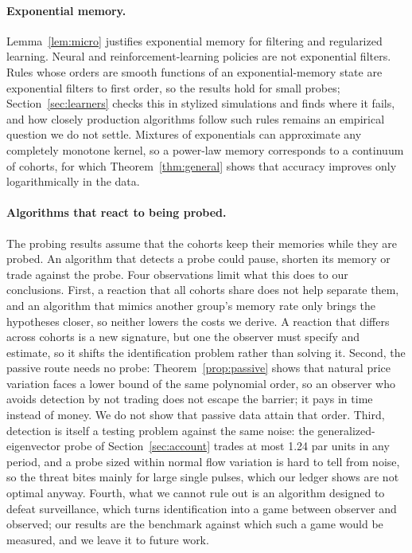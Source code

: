 \documentclass[12pt]{article}
\theoremstyle{definition}
\theoremstyle{remark}
\begin{document}
\paragraph{Exponential memory.} Lemma~\ref{lem:micro} justifies exponential memory for filtering and regularized learning. Neural and reinforcement-learning policies are not exponential filters. Rules whose orders are smooth functions of an exponential-memory state are exponential filters to first order, so the results hold for small probes; Section~\ref{sec:learners} checks this in stylized simulations and finds where it fails, and how closely production algorithms follow such rules remains an empirical question we do not settle. Mixtures of exponentials can approximate any completely monotone kernel, so a power-law memory corresponds to a continuum of cohorts, for which Theorem~\ref{thm:general} shows that accuracy improves only logarithmically in the data.

\paragraph{Algorithms that react to being probed.} The probing results assume that the cohorts keep their memories while they are probed. An algorithm that detects a probe could pause, shorten its memory or trade against the probe. Four observations limit what this does to our conclusions. First, a reaction that all cohorts share does not help separate them, and an algorithm that mimics another group's memory rate only brings the hypotheses closer, so neither lowers the costs we derive. A reaction that differs across cohorts is a new signature, but one the observer must specify and estimate, so it shifts the identification problem rather than solving it. Second, the passive route needs no probe: Theorem~\ref{prop:passive} shows that natural price variation faces a lower bound of the same polynomial order, so an observer who avoids detection by not trading does not escape the barrier; it pays in time instead of money. We do not show that passive data attain that order. Third, detection is itself a testing problem against the same noise: the generalized-eigenvector probe of Section~\ref{sec:account} trades at most 1.24 par units in any period, and a probe sized within normal flow variation is hard to tell from noise, so the threat bites mainly for large single pulses, which our ledger shows are not optimal anyway. Fourth, what we cannot rule out is an algorithm designed to defeat surveillance, which turns identification into a game between observer and observed; our results are the benchmark against which such a game would be measured, and we leave it to future work.
\end{document}

